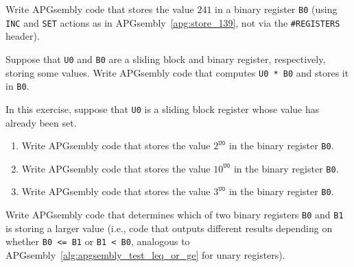 \begin{multicols}{2}
	
	\mfilbreak
	
	
	\begin{problem}\label{exer:universal_computation_apgsembly_set_binary_value} 
		Write APGsembly code that stores the value $241$ in a binary register \texttt{B0} (using \texttt{INC} and \texttt{SET} actions as in APGsembly~\ref{apg:store_139}, not via the \texttt{\#REGISTERS} header).
	\end{problem}
	
	
	\mfilbreak
	
	
	\begin{problem}\label{exer:universal_computation_apgsembly_multiply_binary} 
		Suppose that \texttt{U0} and \texttt{B0} are a sliding block and binary register, respectively, storing some values. Write APGsembly code that computes \texttt{U0 * B0} and stores it in \texttt{B0}.
	\end{problem}
	
	
	\mfilbreak
	
	
	\begin{problem}\label{exer:universal_computation_apgsembly_exponentiate}
		In this exercise, suppose that \texttt{U0} is a sliding block register whose value has already been set.\smallskip
		
		\begin{enumerate}[label=\bf\color{ocre}(\alph*)]
			\item {} Write APGsembly code that stores the value $2^{\texttt{U0}}$ in the binary register \texttt{B0}.
			
			\item {} Write APGsembly code that stores the value $10^{\texttt{U0}}$ in the binary register \texttt{B0}.
			
			\item {} Write APGsembly code that stores the value $3^{\texttt{U0}}$ in the binary register \texttt{B0}.
		\end{enumerate}
	\end{problem}
	
	
	\mfilbreak
	
	
	\begin{problem}\label{exer:universal_computation_apgsembly_binary_compare} 
		Write APGsembly code that determines which of two binary registers \texttt{B0} and \texttt{B1} is storing a larger value (i.e., code that outputs different results depending on whether \texttt{B0 <= B1} or \texttt{B1 < B0}, analogous to APGsembly~\ref{alg:apgsembly_test_leq_or_ge} for unary registers).
	\end{problem}
	

\end{multicols}
